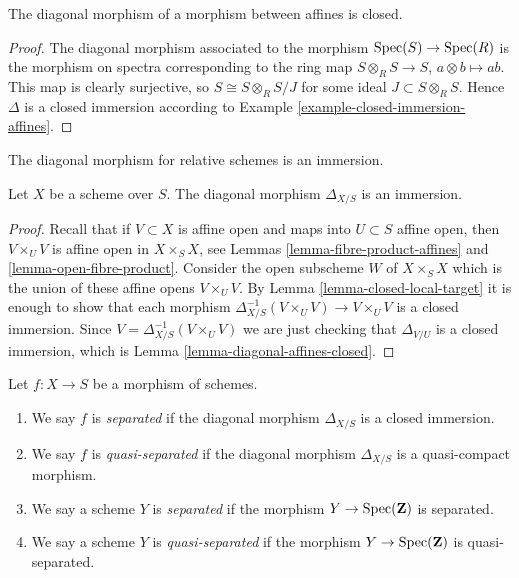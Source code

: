 \begin{lemma}
\label{lemma-diagonal-affines-closed}
The diagonal morphism of a morphism between affines is closed.
\end{lemma}

\begin{proof}
The diagonal morphism associated to the morphism
$\mathop{\mathrm{Spec}}(S) \to \mathop{\mathrm{Spec}}(R)$ is the morphism on spectra
corresponding to the ring
map $S \otimes_R S \to S$, $a \otimes b \mapsto ab$.
This map is clearly surjective, so $S \cong S \otimes_R S/J$
for some ideal $J \subset S \otimes_R S$. Hence
$\Delta$ is a closed immersion according to
Example \ref{example-closed-immersion-affines}.
\end{proof}

\begin{lemma}
\label{lemma-diagonal-immersion}
\begin{slogan}
The diagonal morphism for relative schemes is an immersion.
\end{slogan}
Let $X$ be a scheme over $S$.
The diagonal morphism $\Delta_{X/S}$ is an immersion.
\end{lemma}

\begin{proof}
Recall that if $V \subset X$ is affine open and maps into
$U \subset S$ affine open, then $V \times_U V$ is affine open
in $X \times_S X$, see Lemmas \ref{lemma-fibre-product-affines}
and \ref{lemma-open-fibre-product}.
Consider the open subscheme $W$ of $X \times_S X$ which
is the union of these affine opens $V \times_U V$.
By Lemma \ref{lemma-closed-local-target} it is enough
to show that each morphism
$\Delta_{X/S}^{-1}(V \times_U V) \to V \times_U V$ is
a closed immersion. Since $V = \Delta_{X/S}^{-1}(V \times_U V)$
we are just checking that $\Delta_{V/U}$ is a closed
immersion, which is Lemma \ref{lemma-diagonal-affines-closed}.
\end{proof}

\begin{definition}
\label{definition-separated}
\begin{reference}
\cite[Chapter II, \S 1, no. 34, axiom $(\mathrm{VA}_{II})$,
p. 227]{FAC}
\end{reference}
Let $f : X \to S$ be a morphism of schemes.
\begin{enumerate}
\item We say $f$ is {\it separated} if the diagonal morphism $\Delta_{X/S}$
is a closed immersion.
\item We say $f$ is {\it quasi-separated} if the diagonal morphism
$\Delta_{X/S}$ is a quasi-compact morphism.
\item We say a scheme $Y$ is {\it separated} if the morphism
$Y \to \mathop{\mathrm{Spec}}(\mathbf{Z})$ is separated.
\item We say a scheme $Y$ is {\it quasi-separated} if the morphism
$Y \to \mathop{\mathrm{Spec}}(\mathbf{Z})$ is quasi-separated.
\end{enumerate}
\end{definition}

